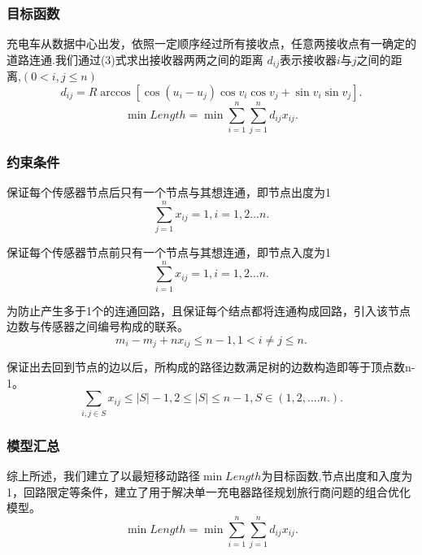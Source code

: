 \documentclass{whutmod}
\begin{document}
\subsubsection{目标函数}
充电车从数据中心出发，依照一定顺序经过所有接收点，任意两接收点有一确定的道路连通.我们通过(3)式求出接收器两两之间的距离
$d_{ij}$表示接收器$i$与$j$之间的距离,$(0<i,j\leq n )$
\begin{equation}
	d_{ij}=R \arccos \left[\cos (u_{i}-u_{j}) \cos v_{i} \cos v_{j}+\sin v_{i} \sin v_{j}\right].
\end{equation}
\begin{equation}
	\min Length=\min\sum_{i=1}^{n}\sum_{j=1}^nd_{ij}x_{ij}.
\end{equation}

\subsubsection{约束条件}
保证每个传感器节点后只有一个节点与其想连通，即节点出度为1
\begin{equation}
	\sum_{j=1}^{n} x_{ij} = 1,i=1,2...n.
\end{equation}

保证每个传感器节点前只有一个节点与其想连通，即节点入度为1
\begin{equation}
	\sum_{i=1}^{n} x_{ij} = 1,i=1,2...n.
\end{equation}

为防止产生多于1个的连通回路，且保证每个结点都将连通构成回路，引入该节点边数与传感器之间编号构成的联系。
\begin{equation}
	m_i-m_j+nx_{ij}\le n-1,1<i\ne j\le n.
\end{equation}

保证出去回到节点的边以后，所构成的路径边数满足树的边数构造即等于顶点数n-1。
\begin{equation}
	\sum_{i,j\in S}x_{ij}\leq |S|-1,2\leq |S|\leq n-1, S\in(1,2,....n.).
\end{equation}

\subsubsection{模型汇总}
综上所述，我们建立了以最短移动路径$\min Length$为目标函数,节点出度和入度为1，回路限定等条件，建立了用于解决单一充电器路径规划旅行商问题的组合优化模型。
\begin{equation}
	\min Length=\min\sum_{i=1}^{n}\sum_{j=1}^nd_{ij}x_{ij}.
\end{equation}
\end{document}
